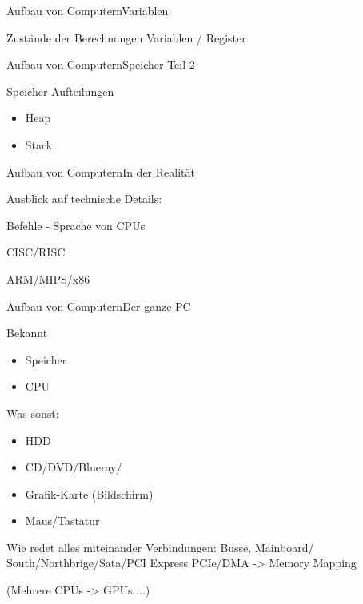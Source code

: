 \begin{frame}{Aufbau von Computern}{Variablen}

	Zustände der Berechnungen 
	Variablen / Register
	
\end{frame}


\begin{frame}{Aufbau von Computern}{Speicher Teil 2}
		
	Speicher Aufteilungen
	\begin{itemize}
	\item Heap
	\item Stack
	\end{itemize}
	
\end{frame}





\begin{frame}{Aufbau von Computern}{In der Realität}
		
	Ausblick auf technische Details:

	Befehle - Sprache von CPUs
	
	CISC/RISC
	
	ARM/MIPS/x86
	
\end{frame}


\begin{frame}{Aufbau von Computern}{Der ganze PC}
		
	Bekannt
	\begin{itemize}
	\item Speicher
	\item CPU
	\end{itemize}
	
	Was sonst:
	
	\begin{itemize}
	\item HDD
	\item CD/DVD/Blueray/
	\item Grafik-Karte (Bildschirm)
	\item Maus/Tastatur
	\end{itemize}
	 
	 Wie redet alles miteinander
	 Verbindungen: Busse, Mainboard/ South/Northbrige/Sata/PCI Express PCIe/DMA 
	 	-> Memory Mapping
	 	
	 
	 (Mehrere CPUs -> GPUs ...)
	
\end{frame}



